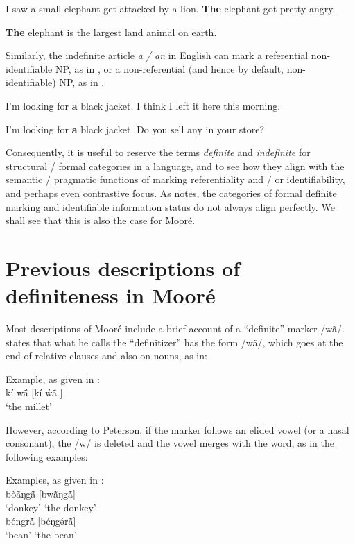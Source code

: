 \documentclass[output=paper]{langsci/langscibook}
\begin{document}
\ea\label{ex:teo:6}
I saw a small elephant get attacked by a lion. \textbf{The} elephant got pretty angry.
\z

\ea\label{ex:teo:7}
\textbf{The} elephant is the largest land animal on earth.
\z

Similarly, the indefinite article \textit{a / an} in English can mark a referential non-identifiable NP, as in , or a non-referential (and hence by default, non-identifiable) NP, as in .

\ea\label{ex:teo:8}
I’m looking for \textbf{a} black jacket. I think I left it here this morning. 
\z

\ea\label{ex:teo:9}
I’m looking for \textbf{a} black jacket. Do you sell any in your store? 
\z

Consequently, it is useful to reserve the terms \textit{definite} and \textit{indefinite} for structural / formal categories in a language, and to see how they align with the semantic / pragmatic functions of marking referentiality and / or identifiability, and perhaps even contrastive focus. As \citet[79]{Lambrecht1994} notes, the categories of formal definite marking and identifiable information status do not always align perfectly. We shall see that this is also the case for Mooré.

\section{Previous descriptions of definiteness in Mooré}\label{sec:teo:3}

Most descriptions of Mooré include a brief account of a “definite” marker /wã/. \citet[77]{Peterson1971} states that what he calls the “definitizer” has the form /wã/, which goes at the end of relative clauses and also on nouns, as in:

\ea\label{ex:teo:10}
Example, as given in \citet[77]{Peterson1971}:\\
 kí w\'{ã}  [kí \'{w}\'{ã} ]\\
‘the millet’
\z

However, according to Peterson, if the marker follows an elided vowel (or a nasal consonant), the /w/ is deleted and the vowel merges with the word, as in the following examples:

\ea\label{ex:teo:11}
Examples, as given in \citet[77]{Peterson1971}:\\
  bòãŋg\'{ã}  [bw\`{ã}ŋg\'{ã}] \\
{‘donkey’}  {‘the donkey’} \\
  béngr\'{ã}  [béŋg\'{ə}r\'{ã}] \\
‘bean’  {‘the bean’} \\
\z
\end{document}

